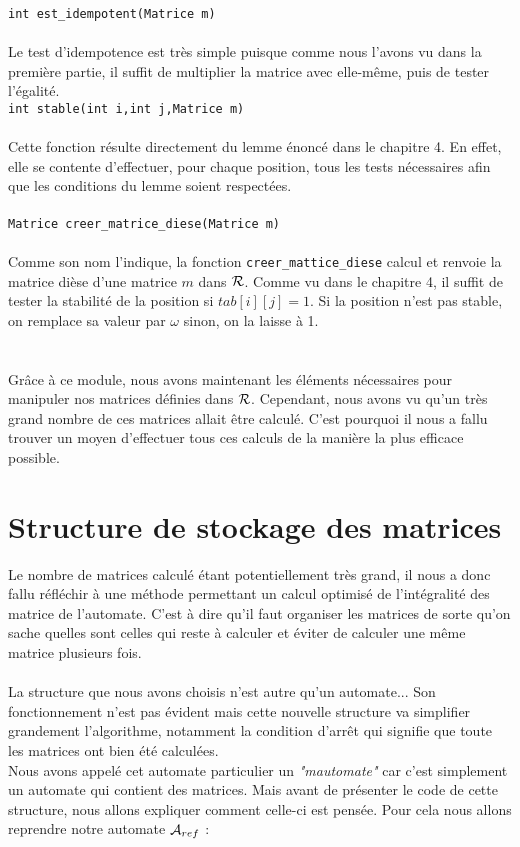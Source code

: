 \documentclass{report}
\begin{document}
\verb?int est_idempotent(Matrice m)?\\\\
Le test d'idempotence est très simple puisque comme nous l'avons vu dans la première partie, il suffit de multiplier la matrice avec elle-même, puis de tester l'égalité.\\

\verb?int stable(int i,int j,Matrice m)?\\\\
Cette fonction résulte directement du lemme énoncé dans le chapitre 4. En effet, elle se contente d'effectuer, pour chaque position, tous les tests nécessaires afin que les conditions du lemme soient respectées.\\\\

\verb?Matrice creer_matrice_diese(Matrice m)?\\\\
Comme son nom l'indique, la fonction \verb?creer_mattice_diese? calcul et renvoie la matrice dièse d'une matrice $m$ dans $\mathcal{R}$. Comme vu dans le chapitre 4, il suffit de tester la stabilité de la position si $tab[i][j] = 1$. Si la position n'est pas stable, on remplace sa valeur par $\omega$ sinon, on la laisse à 1.\\\\\\

Grâce à ce module, nous avons maintenant les éléments nécessaires pour manipuler nos matrices définies dans $\mathcal{R}$. Cependant, nous avons vu qu'un très grand nombre de ces matrices allait être calculé. C'est pourquoi il nous a fallu trouver un moyen d'effectuer tous ces calculs de la manière la plus efficace possible.

\chapter{Structure de stockage des matrices}


Le nombre de matrices calculé étant potentiellement très grand, il nous a donc fallu réfléchir à une méthode permettant un calcul optimisé de l'intégralité des matrice de l'automate. C'est à dire qu'il faut organiser les matrices de sorte qu'on sache quelles sont celles qui reste à calculer et éviter de calculer une même matrice plusieurs fois. \\\\
La structure que nous avons choisis n'est autre qu'un automate... Son fonctionnement n'est pas évident mais cette nouvelle structure va simplifier grandement l'algorithme, notamment la condition d'arrêt qui signifie que toute les matrices ont bien été calculées.\\
Nous avons appelé cet automate particulier un \textit{"mautomate"} car c'est simplement un automate qui contient des matrices. Mais avant de présenter le code de cette structure, nous allons expliquer comment celle-ci est pensée. Pour cela nous allons reprendre notre automate $\mathcal{A}_{ref}$ :\\\\
\end{document}
